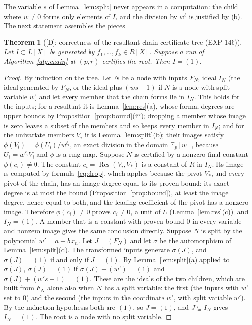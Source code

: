 \documentclass[11pt]{article}
\newtheorem{theorem}{Theorem}[section]
\theoremstyle{remark}
\begin{document}
The variable $s$ of Lemma~\ref{lem:split} never appears in a computation: the child where $w\ne0$ forms only elements of $I$, and the division by $w^{\ell}$ is justified by (b). The next statement assembles the pieces.

\begin{theorem}[{[D]}; correctness of the resultant-chain certificate tree (EXP-146)]\label{thm:chain}
Let $I\subset L[X]$ be generated by $f_1,\dots,f_k\in R[X]$. Suppose a run of Algorithm~\ref{alg:chain} at $(p,r)$ certifies the root. Then $I=(1)$.
\end{theorem}
\begin{proof}
By induction on the tree. Let $N$ be a node with inputs $F_N$, ideal $I_N$ (the ideal generated by $F_N$, or the ideal plus $(ws-1)$ if $N$ is a node with split variable $w$) and let every member that the chain forms lie in $I_N$. This holds for the inputs; for a resultant it is Lemma~\ref{lem:res}(a), whose formal degrees are upper bounds by Proposition~\ref{prop:bound}(iii);
dropping a member whose image is zero leaves a subset of the members and so keeps every member in $I_N$; and for the univariate members $V_i$ it is Lemma~\ref{lem:split}(b); their images satisfy $\phi(V_i)=\phi(U_i)/w^{\ell_i}$, an exact division in the domain $\mathbb F_p[w]$, because $U_i=w^{\ell_i}V_i$ and $\phi$ is a ring map. Suppose $N$ is certified by a nonzero final constant $\phi(c_i)\ne0$. The constant $c_i=\operatorname{Res}(V_i,V_\ast)$ is a constant of $R$ in $I_N$.
Its image is computed by formula~\eqref{eq:drop}, which applies because the pivot $V_\ast$, and every pivot of the chain, has an image degree equal to its proven bound: its exact degree is at most the bound (Proposition~\ref{prop:bound}), at least the image degree, hence equal to both, and the leading coefficient of the pivot has a nonzero image.
Therefore $\phi(c_i)\ne0$ proves $c_i\ne0$, a unit of $L$ (Lemma~\ref{lem:res}(c)), and $I_N=(1)$. A member that is a constant with proven bound $0$ in every variable and nonzero image gives the same conclusion directly. Suppose $N$ is split by the polynomial $w'=a+b\,x_n$. Let $J=(F_N)$ and let $\sigma$ be the automorphism of Lemma~\ref{lem:split}(d). The transformed inputs generate $\sigma(J)$, and $\sigma(J)=(1)$ if and only if $J=(1)$. By Lemma~\ref{lem:split}(a) applied to $\sigma(J)$, $\sigma(J)=(1)$ if $\sigma(J)+(w')=(1)$ and $\sigma(J)+(w's-1)=(1)$. These are the ideals of the two children, which are built from $F_N$ alone also when $N$ has a split variable: the first (the inputs with $w'$ set to $0$) and the second (the inputs in the coordinate $w'$, with split variable $w'$). By the induction hypothesis both are $(1)$, so $J=(1)$, and $J\subseteq I_N$ gives $I_N=(1)$. The root is a node with no split variable.
\end{proof}
\end{document}
